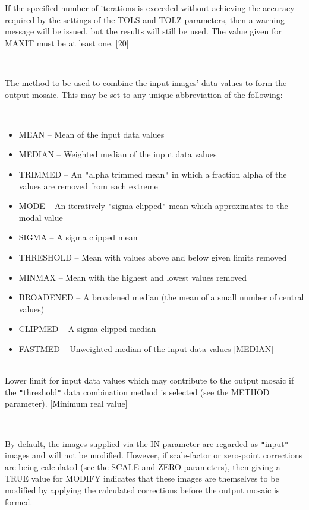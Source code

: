 \documentclass[twoside,11pt]{article}
\renewcommand{\_}{\texttt{\symbol{95}}}
\newcommand{\qt}[1]{{\tt "}#1{\tt "}}
\newcommand{\sstsubsection}[1]{ \item[{#1}] \mbox{} \\}
\newcommand{\sstitemlist}[1]{
  \mbox{} \\
  \vspace{-3.5ex}
  \begin{itemize}
     #1
  \end{itemize}
}
\newcommand{\sstitem}{\item}
\newcommand{\sstsubsection}[1]{\item[{#1}]}
\newcommand{\sstitemlist}[1]{
      \begin{itemize}
         #1
      \end{itemize}
      \\
   }
\newcommand{\sstitem}{\item}
\begin{document}
{{{         If the specified number of iterations is exceeded without
         achieving the accuracy required by the settings of the TOLS
         and TOLZ parameters, then a warning message will be issued,
         but the results will still be used. The value given for MAXIT
         must be at least one.
         [20]
      }
      \sstsubsection{
         METHOD = LITERAL (Read)
      } {
         The method to be used to combine the input images' data values
         to form the output mosaic. This may be set to any unique
         abbreviation of the following:
         \sstitemlist{

            \sstitem
               MEAN      -- Mean of the input data values

            \sstitem
               MEDIAN    -- Weighted median of the input data values

            \sstitem
               TRIMMED   -- An \qt{alpha trimmed mean} in which a fraction
                               alpha of the values are removed from
                               each extreme

            \sstitem
               MODE      -- An iteratively \qt{sigma clipped} mean which
                               approximates to the modal value

            \sstitem
               SIGMA     -- A sigma clipped mean

            \sstitem
               THRESHOLD -- Mean with values above and below given
                               limits removed

            \sstitem
               MINMAX    -- Mean with the highest and lowest values
                               removed

            \sstitem
               BROADENED -- A broadened median (the mean of a small
                               number of central values)
            \sstitem
               CLIPMED   -- A sigma clipped median

            \sstitem
               FASTMED   -- Unweighted median of the input data values
            [MEDIAN]
         }
      }
      \sstsubsection{
         MIN = \_REAL (Read)
      } {
         Lower limit for input data values which may contribute to the
         output mosaic if the \qt{threshold} data combination method is
         selected (see the METHOD parameter).
         [Minimum real value]
      }
      \sstsubsection{
         MODIFY = \_LOGICAL (Read)
      } {
         By default, the images supplied via the IN parameter are
         regarded as \qt{input} images and will not be modified. However, if
         scale-factor or zero-point corrections are being calculated
         (see the SCALE and ZERO parameters), then giving a TRUE value
         for MODIFY indicates that these images are themselves to be
         modified by applying the calculated corrections before the
         output mosaic is formed.

}}}
\end{document}
